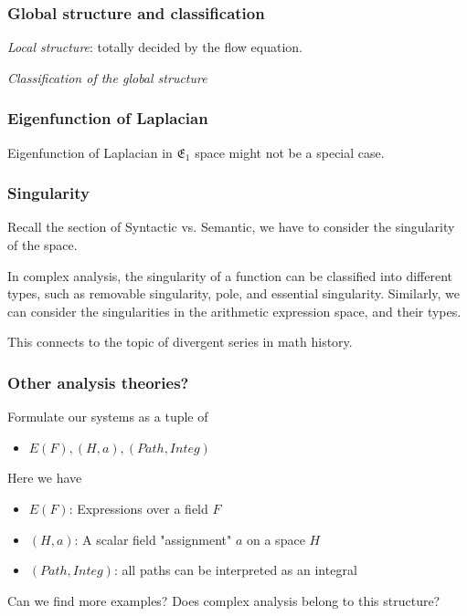 \documentclass[aspectratio=169]{beamer}
\begin{document}
\begin{frame}
    \frametitle{Global structure and classification}

\emph{Local structure}: totally decided by the flow equation.

\emph{Classification of the global structure}

\end{frame}

\begin{frame}
\frametitle{Eigenfunction of Laplacian}
    Eigenfunction of Laplacian in $\mathfrak{E_1}$ space might not be a special case.
\end{frame}

\begin{frame}
    \frametitle{Singularity}
    Recall the section of Syntactic vs. Semantic, we have to consider the singularity of the space.

    In complex analysis, the singularity of a function can be classified into different types, such as removable singularity, pole, and essential singularity.
    Similarly, we can consider the singularities in the arithmetic expression space, and their types.

    This connects to the topic of divergent series in math history.
\end{frame}

\begin{frame}
    \frametitle{Other analysis theories?}
    Formulate our systems as a tuple of
    \begin{itemize}
        \item $E(F), (H, a), (Path, Integ)$
    \end{itemize}
    Here we have
    \begin{itemize}
        \item $E(F)$: Expressions over a field $F$
        \item $(H, a)$: A scalar field "assignment" $a$ on a space $H$
        \item $(Path, Integ)$: all paths can be interpreted as an integral
    \end{itemize}
    Can we find more examples? Does complex analysis belong to this structure?
\end{frame}
\end{document}
